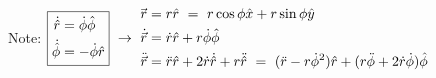 \documentclass[12pt]{article}
\newcommand{\hs}{\hspace{1pt}} %
\newcommand{\nhs}{\hspace{-1pt}} %
\newcommand{\hsvec}[1]{\nhs\vec{\hs #1}} %
\begin{document}
\vspace{15pt}\noindent
Note: \hspace{10pt}\(
    \boxed{
        \begin{aligned}
            \dot{\hat{r}} & = \dot{\phi} \hat{\phi} \\
            \dot{\hat{\phi}} & = - \dot{\phi} \hat{r}
        \end{aligned}
    }
    \ \rightarrow\ 
    \begin{aligned}
        \hsvec{r} & = r \hat{r} 
            \ =\ r \cos\phi \hat{x} + r \sin\phi \hat{y}
            \\
        \dot{\hsvec{r}} & = \dot{r} \hat{r} + r \dot{\phi} \hat{\phi}\\
        \ddot{\hsvec{r}} & = \ddot{r} \hat{r} + 2 \dot{r} \dot{\hat{r}} + r \ddot{\hat{r}} 
            \ =\ ( \ddot{r} - r \dot{\phi} ^2 )\hat{r} + ( r \ddot{\phi} + 2 \dot{r} \dot{\phi} ) \hat{\phi} 
    \end{aligned} 
\)
\end{document}
